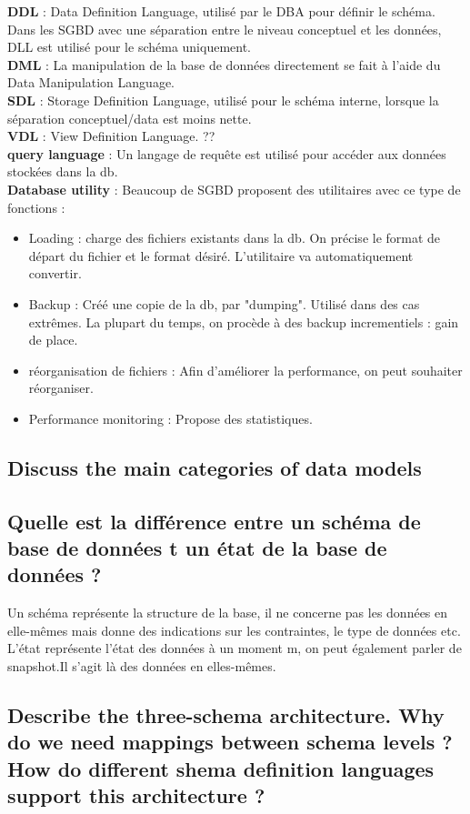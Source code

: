 \textbf{DDL} :
Data Definition Language, utilisé par le DBA pour définir le schéma.
Dans les SGBD avec une séparation entre le niveau conceptuel et les données, 
DLL est utilisé pour le schéma uniquement. \\
\textbf{DML} : 
La manipulation de la base de données directement se fait à l'aide du 
Data Manipulation Language.\\
\textbf{SDL} : Storage Definition Language, utilisé pour le schéma interne, lorsque la séparation conceptuel/data est moins nette.\\
\textbf{VDL} : View Definition Language. ?? \\
\textbf{query language} : Un langage de requête est utilisé pour accéder aux données stockées dans la db. \\
\textbf{Database utility} : 
Beaucoup de SGBD proposent des utilitaires avec ce type de fonctions :
\begin{itemize}
	\item Loading : charge des fichiers existants dans la db. On précise le 
	format de départ du fichier et le format désiré. L'utilitaire 
	va automatiquement convertir. 
	 \item Backup : Créé une copie de la db, par "dumping". Utilisé dans des 
	 cas extrêmes. La plupart du temps, on procède à des backup incrementiels : gain de place.
	 \item réorganisation de fichiers : Afin d'améliorer la performance, on peut souhaiter réorganiser.
	 \item Performance monitoring : Propose des statistiques.
\end{itemize}

\subsection{Discuss the main categories of data models}


\subsection{Quelle est la différence entre un schéma de base de données t  un état de la base de données ?}
Un schéma représente la structure de la base, il ne concerne pas les données 
en elle-mêmes mais donne des indications sur les contraintes, le type de données etc.
L'état représente l'état des données à un moment m, on 
peut également parler de snapshot.Il s'agit là des données en elles-mêmes.


\subsection{Describe the three-schema architecture. Why do we need mappings between schema levels ? How do different shema definition languages support this architecture ?}


